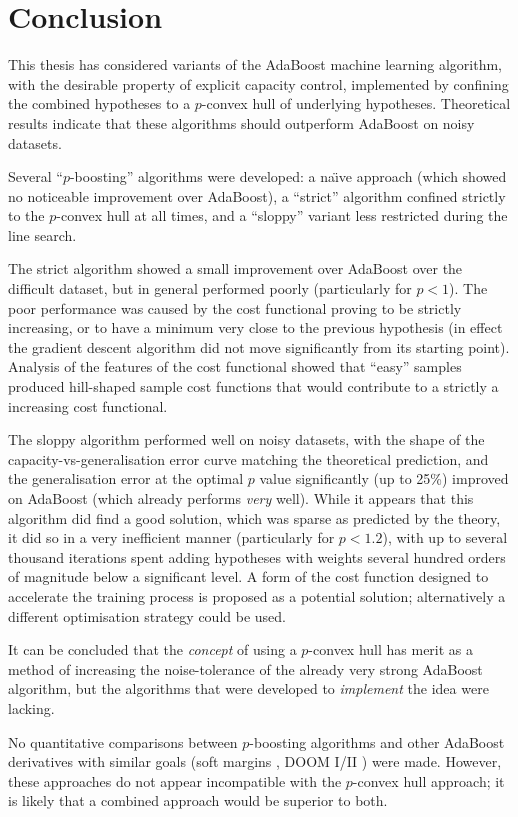
\chapter{Conclusion}
\label{chapter:conclusion}

This thesis has considered variants of the AdaBoost machine learning
algorithm, with the desirable property of explicit capacity control,
implemented by confining the combined hypotheses to a $p$-convex hull
of underlying hypotheses.  Theoretical results indicate that these
algorithms should outperform AdaBoost on noisy datasets.

Several ``$p$-boosting'' algorithms were developed: a na\"{\i}ve
approach (which showed no noticeable improvement over AdaBoost), a
``strict'' algorithm confined strictly to the $p$-convex hull at all
times, and a ``sloppy'' variant less restricted during the line
search.

The strict algorithm showed a small improvement over AdaBoost over the
difficult  dataset, but in general performed poorly
(particularly for $p < 1$).  The poor performance was caused by the
cost functional proving to be strictly increasing, or to have a
minimum very close to the previous hypothesis (in effect the gradient
descent algorithm did not move significantly from its starting point).
Analysis of the features of the cost functional showed that ``easy''
samples produced hill-shaped sample cost functions that would
contribute to a strictly a increasing cost functional.

The sloppy algorithm performed well on noisy datasets, with the shape
of the capacity-vs-gener\-alis\-ation error curve matching the theoretical
prediction, and the generalisation error at the optimal
$p$ value significantly (up to 25\%) improved on AdaBoost (which
already performs \emph{very} well).  While it appears that this
algorithm did find a good solution, which was sparse as predicted by
the theory, it did so in a very inefficient manner (particularly for
$p < 1.2$), with up to several thousand iterations spent adding
hypotheses with weights several hundred orders of magnitude below a
significant level.  A form of the cost function designed to
accelerate the training process is proposed as a potential solution;
alternatively a different optimisation strategy could be used.

It can be concluded that the \emph{concept} of using a $p$-convex hull
has merit as a method of increasing the noise-tolerance of the already
very strong AdaBoost algorithm, but the algorithms that were developed
to \emph{implement} the idea were lacking.

No quantitative comparisons between $p$-boosting algorithms and
other AdaBoost derivatives with similar goals (soft margins
\cite{Ratsch98}, DOOM I/II \cite{Mason99, Mason99a}) were made.
However, these approaches do not appear incompatible with the $p$-convex
hull approach; it is likely that a combined approach would be superior
to both.

